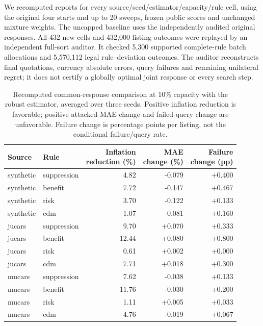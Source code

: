 \documentclass[11pt]{article}
\begin{document}
We recomputed reports for every source/seed/estimator/capacity/rule cell, using
the original four starts and up to 20 sweeps, frozen public scores and unchanged
mixture weights. The uncapped baseline uses the independently audited original
responses. All 432 new cells and 432,000 listing outcomes were replayed by an
independent full-sort auditor. It checked 5,300 supported complete-rule batch
allocations and 5,570,112 legal rule--deviation outcomes. The auditor reconstructs
final quotations, currency absolute errors, query failures and remaining unilateral
regret; it does not certify a globally optimal joint response or every search step.

\begin{table}[ht]
\centering\small
\caption{Recomputed common-response comparison at 10\% capacity with the robust
estimator, averaged over three seeds. Positive inflation reduction is favorable;
positive attacked-MAE change and failed-query change are unfavorable. Failure
change is percentage points per listing, not the conditional failure/query rate.}
\begin{tabular}{llrrr}\toprule
Source & Rule & \shortstack{Inflation\\reduction (\%)} & \shortstack{MAE\\change (\%)} & \shortstack{Failure\\change (pp)}\\\midrule
synthetic & suppression & 4.82 & -0.079 & +0.400 \\
synthetic & benefit & 7.72 & -0.147 & +0.467 \\
synthetic & risk & 3.70 & -0.122 & +0.133 \\
synthetic & cdm & 1.07 & -0.081 & +0.160 \\
jucars & suppression & 9.70 & +0.070 & +0.333 \\
jucars & benefit & 12.44 & +0.080 & +0.800 \\
jucars & risk & 0.61 & +0.002 & +0.000 \\
jucars & cdm & 7.71 & +0.018 & +0.300 \\
mucars & suppression & 7.62 & -0.038 & +0.133 \\
mucars & benefit & 11.76 & -0.030 & +0.200 \\
mucars & risk & 1.11 & +0.005 & +0.033 \\
mucars & cdm & 4.76 & -0.019 & +0.067 \\
\bottomrule\end{tabular}
\end{table}
\end{document}
